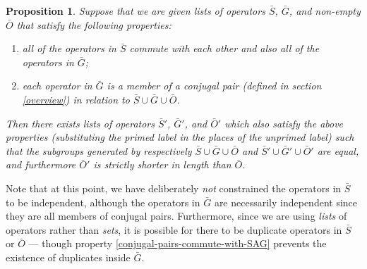 \documentclass[twocolumn,showpacs,preprintnumbers,amsmath,amssymb,nofootinbib,pra,floatfix]{revtex4}
\newtheorem{proposition}{Proposition}
\newenvironment{remark}[1][Remark]{\begin{trivlist}
\item[\hskip \labelsep {\bfseries #1}]}{\end{trivlist}}
\newcommand{\lst}{\bar}
\begin{document}
\begin{proposition} \label{proposition-SG} Suppose that we are given lists of operators $\lst S$, $\lst G$, and non-empty $\lst O$ that satisfy the following properties:
\begin{enumerate}
\item all of the operators in $\lst S$ commute with each other and also all of the operators in $\lst G$; \label{stabs-commute-with-G}
\item each operator in $\lst G$ is a member of a \emph{conjugal pair} (defined in section \ref{overview}) in relation to $\lst S \cup \lst G \cup \lst O$. \label{conjugal-pairs-commute-with-SAG}
\end{enumerate}
Then there exists lists of operators $\lst S'$, $\lst G'$, and $\lst O'$ which also satisfy the above properties (substituting the primed label in the places of the unprimed label) such that the subgroups generated by respectively $\lst S\cup \lst G\cup \lst O$ and $\lst S'\cup \lst G'\cup \lst O'$ are equal, and furthermore $\lst O'$ is strictly shorter in length than $\lst O$.
\end{proposition}

\begin{remark}
Note that at this point, we have deliberately \emph{not} constrained the operators in $\lst S$ to be independent, although the operators in $\lst G$ are necessarily independent since they are all members of conjugal pairs.  Furthermore, since we are using \emph{lists} of operators rather than \emph{sets}, it is possible for there to be duplicate operators in $\lst S$ or $\lst O$ --- though property \ref{conjugal-pairs-commute-with-SAG} prevents the existence of duplicates inside $\lst G$.
\end{remark}
\end{document}
